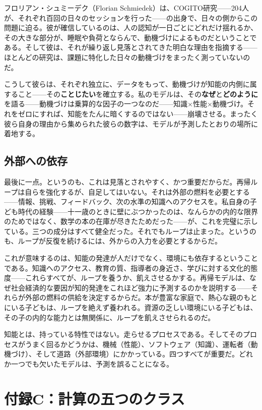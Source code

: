 \documentclass[11pt, twoside, openright]{book}
\begin{document}
フロリアン・シュミーデク（Florian Schmiedek）は、COGITO研究------204人が、それぞれ百回の日々のセッションを行った------の出身で、日々の側からこの問題に迫る。彼が確信しているのは、人の認知が一日ごとにどれだけ揺れるか、その大きな部分が、睡眠や負荷とならんで、動機づけによるものだということである。そして彼は、それが繰り返し見落とされてきた明白な理由を指摘する------ほとんどの研究は、課題に特化した日々の動機づけをまったく測っていないのだ。

こうして彼らは、それぞれ独立に、データをもって、動機づけが知能の内側に属すること------その\textbf{ことじたい}を確立する。私のモデルは、その\textbf{なぜ}と\textbf{どのように}を語る------動機づけは乗算的な因子の一つなのだ------知識×性能×動機づけ。それをゼロにすれば、知能をたんに暗くするのではない------崩壊させる。まったく彼ら自身の理由から集められた彼らの数字は、モデルが予測したとおりの場所に着地する。

\section*{外部への依存}

最後に一点。というのも、これは見落とされやすく、かつ重要だからだ。再帰ループは自らを強化するが、自足してはいない。それは外部の燃料を必要とする------情報、挑戦、フィードバック、次の水準の知識へのアクセスを。私自身の子ども時代の経験------十一歳のときに壁にぶつかったのは、なんらかの内的な限界のためではなく、数学の本の在庫が尽きたためだった------が、これを完璧に示している。三つの成分はすべて健全だった。それでもループは止まった。というのも、ループが反復を続けるには、外からの入力を必要とするからだ。

これが意味するのは、知能の発達が人だけでなく、環境にも依存するということである。知識へのアクセス、教育の質、指導者の身近さ、学びに対する文化的態度------これらすべてが、ループを養うか、飢えさせるかする。再帰モデルは、なぜ社会経済的な要因が知的発達をこれほど強力に予測するのかを説明する------それらが外部の燃料の供給を決定するからだ。本が豊富な家庭で、熱心な親のもとにいる子どもは、ループを絶えず養われる。資源の乏しい環境にいる子どもは、その子の内的な能力とは無関係に、ループを飢えさせられるのだ。

知能とは、持っている特性ではない。走らせるプロセスである。そしてそのプロセスがうまく回るかどうかは、機械（性能）、ソフトウェア（知識）、運転者（動機づけ）、そして道路（外部環境）にかかっている。四つすべてが重要だ。どれか一つでも欠いたモデルは、予測を誤ることになる。


\chapter*{付録C：計算の五つのクラス}
\end{document}
